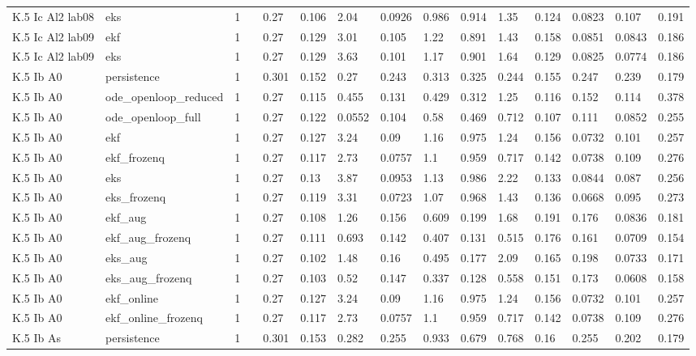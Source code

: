 \begin{table}[t]
\begin{tabular}{lllllllllllllll}
K.5 Ic Al2 lab08 & eks & 1 &  & 0.27 & 0.106 & 2.04 & 0.0926 & 0.986 & 0.914 & 1.35 & 0.124 & 0.0823 & 0.107 & 0.191 \\
K.5 Ic Al2 lab09 & ekf & 1 &  & 0.27 & 0.129 & 3.01 & 0.105 & 1.22 & 0.891 & 1.43 & 0.158 & 0.0851 & 0.0843 & 0.186 \\
K.5 Ic Al2 lab09 & eks & 1 &  & 0.27 & 0.129 & 3.63 & 0.101 & 1.17 & 0.901 & 1.64 & 0.129 & 0.0825 & 0.0774 & 0.186 \\
K.5 Ib A0 & persistence & 1 &  & 0.301 & 0.152 & 0.27 & 0.243 & 0.313 & 0.325 & 0.244 & 0.155 & 0.247 & 0.239 & 0.179 \\
K.5 Ib A0 & ode\_openloop\_reduced & 1 &  & 0.27 & 0.115 & 0.455 & 0.131 & 0.429 & 0.312 & 1.25 & 0.116 & 0.152 & 0.114 & 0.378 \\
K.5 Ib A0 & ode\_openloop\_full & 1 &  & 0.27 & 0.122 & 0.0552 & 0.104 & 0.58 & 0.469 & 0.712 & 0.107 & 0.111 & 0.0852 & 0.255 \\
K.5 Ib A0 & ekf & 1 &  & 0.27 & 0.127 & 3.24 & 0.09 & 1.16 & 0.975 & 1.24 & 0.156 & 0.0732 & 0.101 & 0.257 \\
K.5 Ib A0 & ekf\_frozenq & 1 &  & 0.27 & 0.117 & 2.73 & 0.0757 & 1.1 & 0.959 & 0.717 & 0.142 & 0.0738 & 0.109 & 0.276 \\
K.5 Ib A0 & eks & 1 &  & 0.27 & 0.13 & 3.87 & 0.0953 & 1.13 & 0.986 & 2.22 & 0.133 & 0.0844 & 0.087 & 0.256 \\
K.5 Ib A0 & eks\_frozenq & 1 &  & 0.27 & 0.119 & 3.31 & 0.0723 & 1.07 & 0.968 & 1.43 & 0.136 & 0.0668 & 0.095 & 0.273 \\
K.5 Ib A0 & ekf\_aug & 1 &  & 0.27 & 0.108 & 1.26 & 0.156 & 0.609 & 0.199 & 1.68 & 0.191 & 0.176 & 0.0836 & 0.181 \\
K.5 Ib A0 & ekf\_aug\_frozenq & 1 &  & 0.27 & 0.111 & 0.693 & 0.142 & 0.407 & 0.131 & 0.515 & 0.176 & 0.161 & 0.0709 & 0.154 \\
K.5 Ib A0 & eks\_aug & 1 &  & 0.27 & 0.102 & 1.48 & 0.16 & 0.495 & 0.177 & 2.09 & 0.165 & 0.198 & 0.0733 & 0.171 \\
K.5 Ib A0 & eks\_aug\_frozenq & 1 &  & 0.27 & 0.103 & 0.52 & 0.147 & 0.337 & 0.128 & 0.558 & 0.151 & 0.173 & 0.0608 & 0.158 \\
K.5 Ib A0 & ekf\_online & 1 &  & 0.27 & 0.127 & 3.24 & 0.09 & 1.16 & 0.975 & 1.24 & 0.156 & 0.0732 & 0.101 & 0.257 \\
K.5 Ib A0 & ekf\_online\_frozenq & 1 &  & 0.27 & 0.117 & 2.73 & 0.0757 & 1.1 & 0.959 & 0.717 & 0.142 & 0.0738 & 0.109 & 0.276 \\
K.5 Ib As & persistence & 1 &  & 0.301 & 0.153 & 0.282 & 0.255 & 0.933 & 0.679 & 0.768 & 0.16 & 0.255 & 0.202 & 0.179 \\

\end{tabular}
\end{table}
